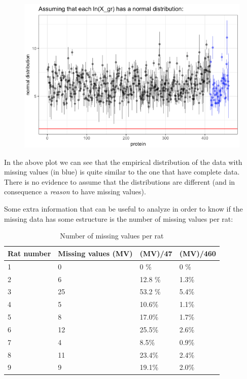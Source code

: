 \documentclass{article}
\begin{document}
\newpage

\begin{figure}[ht!]
\centering
\includegraphics[width=12cm]{figures/missing2.png}
\end{figure}

In the above plot we can see that the empirical distribution of the data with missing values (in blue) is quite similar to the one that have complete data. There is no evidence to assume that the distributions are different (and in consequence a \textit{reason} to have missing values).

Some extra information that can be useful to analyze in order to know if the missing data has some estructure is the number of missing values per rat:

\begin{table}[ht!]
\centering
\caption{Number of missing values per rat}
\begin{tabular}{|l|l|l|l|}
\hline
Rat number & Missing values (MV) & (MV)/47 & (MV)/460 \\ \hline
1          & 0                   & 0 \%    & 0 \%     \\ \hline
2          & 6                   & 12.8 \% & 1.3\%    \\ \hline
3          & 25                  & 53.2 \% & 5.4\%    \\ \hline
4          & 5                   & 10.6\%  & 1.1\%    \\ \hline
5          & 8                   & 17.0\%  & 1.7\%    \\ \hline
6          & 12                  & 25.5\%  & 2.6\%    \\ \hline
7          & 4                   & 8.5\%   & 0.9\%    \\ \hline
8          & 11                  & 23.4\%  & 2.4\%    \\ \hline
9          & 9                   & 19.1\%  & 2.0\%    \\ \hline
\end{tabular}
\end{table}
\end{document}
